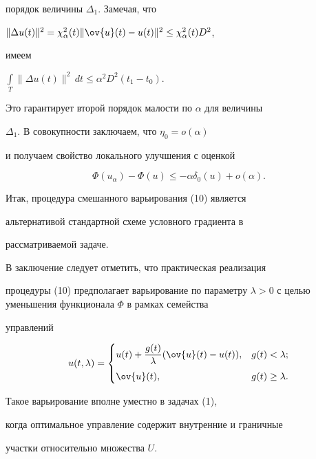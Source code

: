 порядок величины $\Delta_{1}$. Замечая, что


$\| \Delta u(t)\|^{2} = \chi_{\alpha}^{2}(t)


\| \ov{u}(t) - u(t)\|^{2} \leq \chi_{\alpha}^{2}(t) D^{2}$,


имеем


$\int\limits_{T} \| \Delta u(t)\|^{2}\,dt \leq


\alpha^{2} D^{2} (t_{1} - t_{0})$.


Это гарантирует второй порядок малости по $\alpha$ для величины


$\Delta_{1}$. В совокупности заключаем, что $\eta_{0} = o(\alpha)$


и получаем свойство локального улучшения с оценкой


$$


\Phi(u_{\alpha}) - \Phi(u) \leq - \alpha \delta_{0}(u) + o(\alpha).


$$


Итак, процедура смешанного варьирования (10) является


альтернативой стандартной схеме условного градиента в


рассматриваемой задаче.





В заключение следует отметить, что практическая реализация


процедуры (10) предполагает варьирование по параметру $\lambda >


0$ с целью уменьшения функционала $\Phi$ в рамках семейства


управлений


$$


u(t, \lambda) =


\begin{cases}


u(t) + \dfrac{g(t)}{\lambda}(\ov{u}(t) - u(t)), & g(t) < \lambda;\\[3mm]


\ov{u}(t), & g(t) \geq \lambda.


\end{cases}


$$


Такое варьирование вполне уместно в задачах (1),


когда оптимальное управление содержит внутренние и граничные


участки относительно множества $U$.





